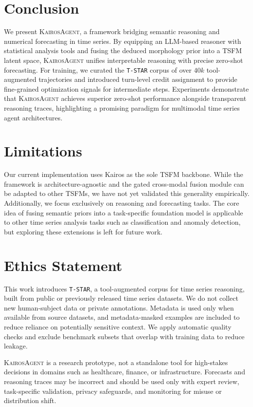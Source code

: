 \documentclass[11pt]{article}
\newcommand{\method}{\textsc{KairosAgent}\xspace}
\begin{document}
\section{Conclusion}
We present \method, a framework bridging semantic reasoning and numerical forecasting in time series.
By equipping an LLM-based reasoner with statistical analysis tools and fusing the deduced morphology prior into a TSFM latent space, \method unifies interpretable reasoning with precise zero-shot forecasting.
For training, we curated the \texttt{T-STAR} corpus of over $40k$ tool-augmented trajectories and introduced turn-level credit assignment to provide fine-grained optimization signals for intermediate steps.
Experiments demonstrate that \method achieves superior zero-shot performance alongside transparent reasoning traces, highlighting a promising paradigm for multimodal time series agent architectures.

\section*{Limitations}
Our current implementation uses Kairos as the sole TSFM backbone.
While the framework is architecture-agnostic and the gated cross-modal fusion module can be adapted to other TSFMs, we have not yet validated this generality empirically.
Additionally, we focus exclusively on reasoning and forecasting tasks.
The core idea of fusing semantic priors into a task-specific foundation model is applicable to other time series analysis tasks such as classification and anomaly detection, but exploring these extensions is left for future work.

\section*{Ethics Statement}
This work introduces \texttt{T-STAR}, a tool-augmented corpus for time series reasoning, built from public or previously released time series datasets. We do not collect new human-subject data or private annotations. Metadata is used only when available from source datasets, and metadata-masked examples are included to reduce reliance on potentially sensitive context. We apply automatic quality checks and exclude benchmark subsets that overlap with training data to reduce leakage.

\method is a research prototype, not a standalone tool for high-stakes decisions in domains such as healthcare, finance, or infrastructure. Forecasts and reasoning traces may be incorrect and should be used only with expert review, task-specific validation, privacy safeguards, and monitoring for misuse or distribution shift.
\end{document}
